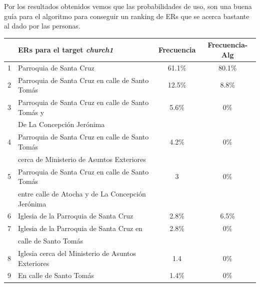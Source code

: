 Por los resultados obtenidos vemos que las probabilidades de uso, son una buena gu\'ia para el algoritmo para conseguir un ranking de ERs que se acerca bastante al dado por las personas. %


\begin{table}[h]
{\footnotesize
\begin{center}
\begin{tabular}{|l|l|c|c|}
\hline
&ERs para el target {\it church1} 					       &  Frecuencia & Frecuencia-Alg \\ \hline \hline
1&Parroquia de Santa Cruz        						   &	61.1\%  &   80.1\% \\ \hline
2&Parroquia de Santa Cruz en calle de Santo Tom\'as        &    12.5\%	&  8.8\% \\ \hline
3&Parroquia de Santa Cruz en calle de Santo Tom\'as y      &    5.6\%   & 0\% \\
&De La Concepci\'on Jer\'onima                             &            &  \\ \hline
4&Parroquia de Santa Cruz en calle de Santo Tom\'as        &     4.2\%  & 0\% \\
&cerca de Ministerio de Asuntos Exteriores                 &            &\\  \hline
5&Parroquia de Santa Cruz en calle de Santo Tom\'as        &	3       &	0\%	 \\
&entre calle de Atocha y de La Concepci\'on Jer\'onima     &	        &			 \\  \hline
6&Iglesia de la Parroquia de Santa Cruz			           &	2.8\%	&6.5\% \\  \hline
7&Iglesia de la Parroquia de Santa Cruz	en      	       &	2.8\%	& 0\% \\  
&calle de Santo Tom\'as									   &	    	&	    \\ \hline
8&Iglesia cerca del Ministerio de Asuntos Exteriores       &	1.4	    &0\% \\  \hline
9&En calle de Santo Tom\'as                                &   1.4\%    &0\% \\  \hline


\end{tabular}
\end{center}}
\end{table}
